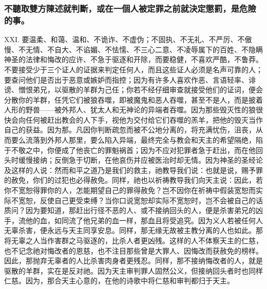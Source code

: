 
\subsubsection{不聽取雙方陳述就判斷，或在一個人被定罪之前就決定懲罰，是危險的事。}

XXI. 要温柔、和蔼、温和、不诡诈、不虚伪；不固执、不无礼、不严厉、不傲慢、不无情、不自大、不谄媚、不怯懦、不三心二意、不凌辱属下的百姓、不隐瞒神圣的法律和悔改的应许、不急于驱逐和开除，而要稳健，不喜欢严酷，不鲁莽。不要接受少于三个证人的证据来判定任何人，而且这些证人必须是名声可靠的人；要查问他们是否出于恶意或嫉妒而指控；因为有许多人喜欢作恶、言语轻率、诽谤、憎恨弟兄，以驱散的羊群为己任；你若不经仔细审查就接受他们的证词，便会分散你的羊群，任凭它们被狼吞噬，即被魔鬼和恶人吞噬，甚至不是人，而是披着人形的野兽——被外邦人、犹太人和无神论的异端者吞噬。因为那些毁灭性的狼很快会向任何被赶出教会的人下手，视他为交付给它们吞噬的羔羊，把他的毁灭当作自己的获益。因为那。凡因你判断疏忽而被不公地分离的，将充满忧伤，沮丧，从而要么流落到外邦人那里，要么陷入异端，最终完全与教会和天主的希望隔绝，陷于不敬之中，你便成了他丧亡的罪魁祸首；因为不应对犯罪者急于赶出，而在他回头时缓慢接纳；反倒急于切断，在他哀伤并应被医治时却无情。因为神圣的圣经论及这样的人说：然而和平之道乃是我们的救主，祂教导我们说：也就是说，赐予罪的赦免，你们的过犯也必得赦免。同样，祂也以祈祷教导我们向天主说：因此，若你不宽恕得罪你的人，怎能期望自己的罪得赦免？岂不因你在祈祷中假装宽恕而实际不宽恕，反使自己更受束缚？当你口说宽恕却实际不宽恕时，岂不会被自己的话质问？因为要知道，那赶出行径不恶的人、或不接纳回头的人，便是杀害弟兄的凶手，流他的血，如同流了他兄弟的血一样，那血且将受追究。因为义人若被任何人无辜杀害，便永远与天主同享安息。同样，那无缘无故被主教分离的人也如此。那将无辜之人当作害群之马驱逐的，比杀人者更凶残。这样的人不体察天主的仁慈，也不记念祂对悔改者的恩慈，也不注目那些曾是大罪人、因悔改而获赦免的榜样。因此，那抛弃无辜者的人比杀害肉身者更残忍。同样，那不接纳悔改者的人，就是驱散的羊群，实在是反对祂。因为天主审判罪人固然公义，但接纳回头者时也同样仁慈。因为，那合天主心意的，在他的诗歌中将仁慈和审判都归于天主。\par

